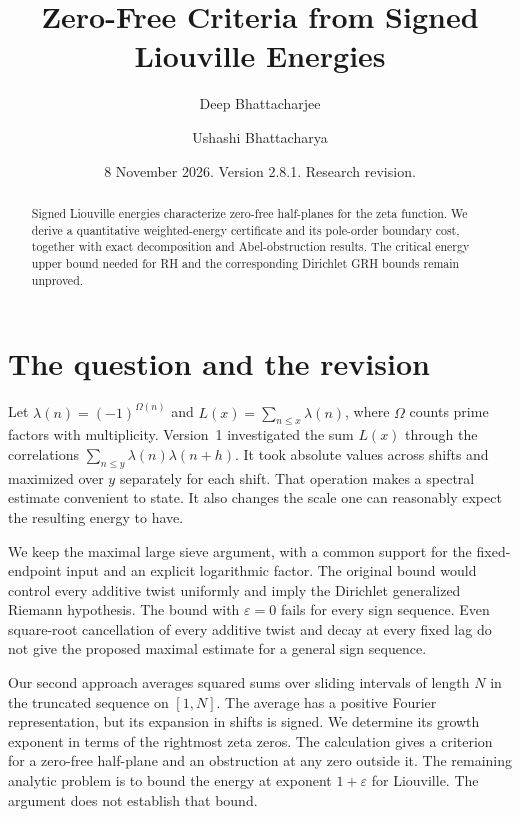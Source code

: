 \documentclass[11pt]{amsart}
\title[Liouville energies and zero-free criteria]{Zero-Free Criteria from Signed Liouville Energies}
\author{Deep Bhattacharjee}
\author{Ushashi Bhattacharya}
\date{8 November 2026. Version 2.8.1. Research revision.}
\theoremstyle{definition}
\theoremstyle{remark}
\numberwithin{equation}{section}
\begin{document}
\begin{abstract}
Signed Liouville energies characterize zero-free half-planes for the zeta function. We derive a quantitative weighted-energy certificate and its pole-order boundary cost, together with exact decomposition and Abel-obstruction results. The critical energy upper bound needed for RH and the corresponding Dirichlet GRH bounds remain unproved.
\end{abstract}
\maketitle
\tableofcontents

\section{The question and the revision}

Let \(\lambda(n)=(-1)^{\Omega(n)}\) and \(L(x)=\sum_{n\le x}\lambda(n)\), where \(\Omega\) counts prime factors with multiplicity. Version~1 \cite{v1} investigated the sum \(L(x)\) through the correlations \(\sum_{n\le y}\lambda(n)\lambda(n+h)\). It took absolute values across shifts and maximized over \(y\) separately for each shift. That operation makes a spectral estimate convenient to state. It also changes the scale one can reasonably expect the resulting energy to have.

We keep the maximal large sieve argument, with a common support for the fixed-endpoint input and an explicit logarithmic factor. The original bound would control every additive twist uniformly and imply the Dirichlet generalized Riemann hypothesis. The bound with \(\varepsilon=0\) fails for every sign sequence. Even square-root cancellation of every additive twist and decay at every fixed lag do not give the proposed maximal estimate for a general sign sequence.

Our second approach averages squared sums over sliding intervals of length \(N\) in the truncated sequence on \([1,N]\). The average has a positive Fourier representation, but its expansion in shifts is signed. We determine its growth exponent in terms of the rightmost zeta zeros. The calculation gives a criterion for a zero-free half-plane and an obstruction at any zero outside it. The remaining analytic problem is to bound the energy at exponent \(1+\varepsilon\) for Liouville. The argument does not establish that bound.
\end{document}
